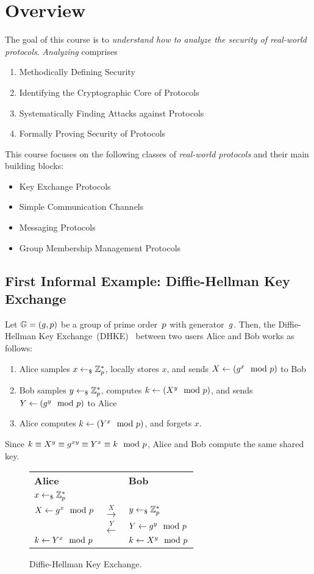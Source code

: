 \section{Overview}
\label{sec:overview}

The goal of this course is to \emph{understand how to analyze the security of real-world protocols}.
\emph{Analyzing} comprises
\begin{enumerate}
    \item Methodically Defining Security
    \item Identifying the Cryptographic Core of Protocols
    \item Systematically Finding Attacks against Protocols
    \item Formally Proving Security of Protocols
\end{enumerate}
This course focuses on the following classes of \emph{real-world protocols} and their main building blocks:
\begin{itemize}
    \item Key Exchange Protocols
    \item Simple Communication Channels
    \item Messaging Protocols
    \item Group Membership Management Protocols
\end{itemize}

\subsection{First Informal Example: Diffie-Hellman Key Exchange}
\label{sec:overview:dhke}

Let $\mathbb{G}=(g,p)$ be a group of prime order~$p$ with generator~$g$.
Then, the Diffie-Hellman Key Exchange~(DHKE)~\cite{DifHel76} between two users Alice and Bob works as follows:
\begin{enumerate}
    \item Alice samples $x\gets_\$\mathbb{Z}_p^*$, locally stores $x$, and sends $X\gets(g^x\mod{p})$ to Bob
    \item Bob samples $y\gets_\$\mathbb{Z}_p^*$, computes $k\gets(X^y\mod{p})$, and sends $Y\gets(g^y\mod{p})$ to Alice
    \item Alice computes $k\gets(Y^x\mod{p})$, and forgets $x$.
\end{enumerate}
Since $k\equiv X^y\equiv g^{xy}\equiv Y^x\equiv k\mod {p}$, Alice and Bob compute the same shared key.

\begin{figure}
    \centering
    \begin{tabular}{lC{3cm}l}
        \textbf{Alice} & & \textbf{Bob}\\
        $x\gets_\$\mathbb{Z}_p^*$ & &\\
        $X\gets g^x\mod{p}$ & $\xrightarrow{X}$ & $y\gets_\$\mathbb{Z}_p^*$\\
        & $\xleftarrow{Y}$ & $Y\gets g^y\mod{p}$\\
        $k\gets Y^x\mod{p}$ & & $k\gets X^y\mod{p}$\\
    \end{tabular}
    \caption{Diffie-Hellman Key Exchange.}
    \label{fig:dhke}
\end{figure}

